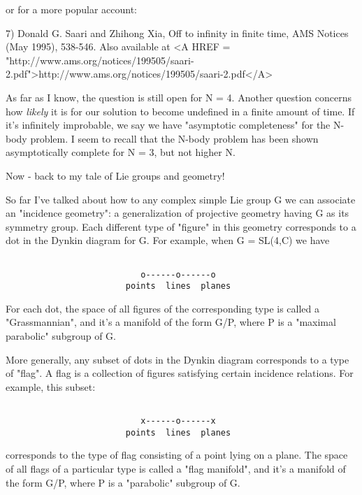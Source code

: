 or for a more popular account:

7) Donald G. Saari and Zhihong Xia, Off to infinity in finite time,
AMS Notices (May 1995), 538-546.  Also available at
<A HREF = "http://www.ams.org/notices/199505/saari-2.pdf">http://www.ams.org/notices/199505/saari-2.pdf</A>

As far as I know, the question is still open for N = 4.  Another
question concerns how \emph{likely} it is for our solution to become
undefined in a finite amount of time.  If it's infinitely improbable, we
say we have "asymptotic completeness" for the N-body problem.  I seem to
recall that the N-body problem has been shown asymptotically complete
for N = 3, but not higher N.  

Now - back to my tale of Lie groups and geometry!

So far I've talked about how to any complex simple Lie group G we can
associate an "incidence geometry": a generalization of projective
geometry having G as its symmetry group.  Each different type of
"figure" in this geometry corresponds to a dot in the Dynkin diagram
for G.  For example, when G = SL(4,C) we have


\begin{verbatim}

                           o------o------o
                        points  lines  planes       
\end{verbatim}
    
For each dot, the space of all figures of the corresponding type is
called a "Grassmannian", and it's a manifold of the form G/P, where P 
is a "maximal parabolic" subgroup of G.

More generally, any subset of dots in the Dynkin diagram corresponds to
a type of "flag".  A flag is a collection of figures satisfying certain
incidence relations.   For example, this subset:


\begin{verbatim}

                           x------o------x
                        points  lines  planes       
\end{verbatim}
    
corresponds to the type of flag consisting of a point lying on a plane.
The space of all flags of a particular type is called a "flag
manifold", and it's a manifold of the form G/P, where P is a
"parabolic" subgroup of G.

